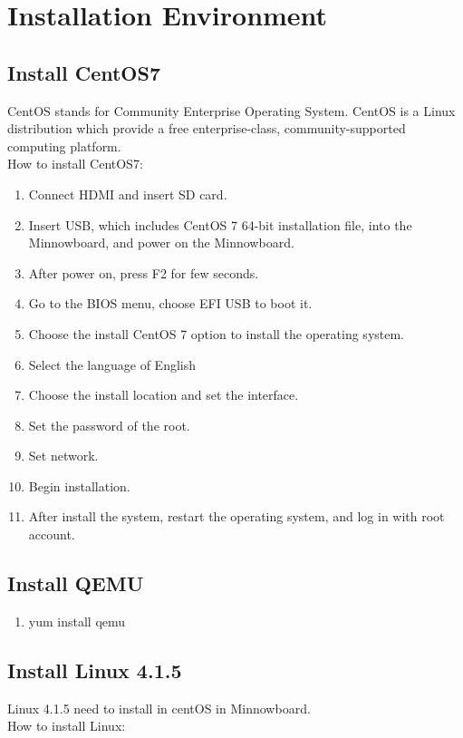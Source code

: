 \documentclass[10pt,draftclsnofoot,journal,compsoc,onecolumn]{IEEEtran}
\begin{document}
	\section{Installation Environment}
	\subsection{Install CentOS7}
	CentOS stands for Community Enterprise Operating System. CentOS is a Linux distribution which provide a free enterprise-class, community-supported computing platform.
	\\How to install CentOS7:
	
	\begin{enumerate}
		\item Connect HDMI and insert SD card.
		\item Insert USB, which includes CentOS 7 64-bit installation file, into the Minnowboard, and power on the Minnowboard.
		\item After power on, press F2 for few seconds.
		\item Go to the BIOS menu, choose EFI USB to boot it.
		\item Choose the install CentOS 7 option to install the operating system.
		\item Select the language of English
		\item Choose the install location and set the interface.
		\item Set the password of the root.
		\item Set network.
		\item Begin installation.
		\item After install the system, restart the operating system, and log in with root account.
	\end{enumerate}
	\subsection{Install QEMU}
	
	\begin{enumerate}
		\item yum install qemu
	\end{enumerate}

	\subsection{Install Linux 4.1.5}
	Linux 4.1.5 need to install in centOS in Minnowboard.
	\\How to install Linux:
	
\end{document}
